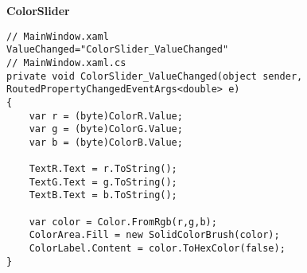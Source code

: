 \textbf{ColorSlider}
\begin{lstlisting}
// MainWindow.xaml
ValueChanged="ColorSlider_ValueChanged"
// MainWindow.xaml.cs
private void ColorSlider_ValueChanged(object sender, RoutedPropertyChangedEventArgs<double> e)
{
	var r = (byte)ColorR.Value;
	var g = (byte)ColorG.Value;
	var b = (byte)ColorB.Value;

	TextR.Text = r.ToString();
	TextG.Text = g.ToString();
	TextB.Text = b.ToString();
	
	var color = Color.FromRgb(r,g,b);
	ColorArea.Fill = new SolidColorBrush(color);
	ColorLabel.Content = color.ToHexColor(false);
}
\end{lstlisting}